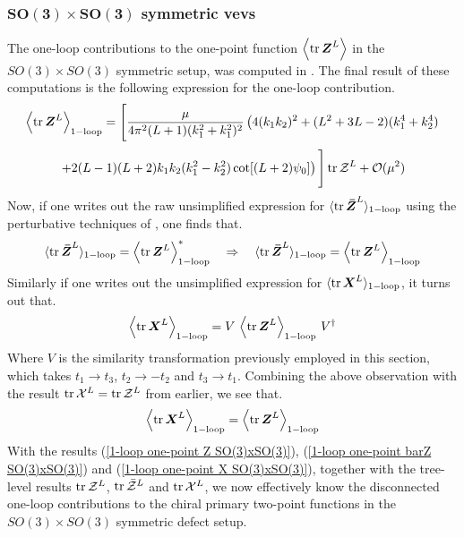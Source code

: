 \subsubsection[$SO(3) \times SO(3)$ symmetric vevs]{$\mathbf{SO(3) \times SO(3)}$ symmetric vevs}
The one-loop contributions to the one-point function $\expval{\tr \boldsymbol{Z}^{L}}$ in the $SO(3) \times SO(3)$ symmetric setup, was computed in \cite{One-point functions in D3-D7}. The final result of these computations is the following expression for the one-loop contribution.
%
%
\begin{equation*}
\expval{\tr \boldsymbol{Z}^{L}}_{\mathrm{1-loop}}
=
\Bigg[
\frac{\mu}{4 \pi^2 (L+1) (k_1^2 + k_1^2)^2}
\left(
4 (k_1 k_2)^2 + (L^2 + 3L - 2) (k_1^4 + k_2^4)
\right.
\end{equation*}
%
%
\begin{equation}\label{1-loop one-point Z SO(3)xSO(3)}
\left.
+ 2(L-1)(L+2) k_1 k_2 (k_1^2 - k_2^2) \cot[(L+2) \psi_0]
\right)
\Bigg]
\tr \mathcal{Z}^{L}
+
\mathcal{O}(\mu^2)
\end{equation}
%
%
Now, if one writes out the raw unsimplified expression for $\langle \tr \boldsymbol{\bar{Z}}^{L} \rangle_{\mathrm{1-loop}}$ using the perturbative techniques of \cite{One-point functions in D3-D7}, one finds that.
%
%
\begin{equation}\label{1-loop one-point barZ SO(3)xSO(3)}
\langle \tr \boldsymbol{\bar{Z}}^{L} \rangle_{\mathrm{1-loop}}
=
\expval{\tr \boldsymbol{Z}^{L}}_{\mathrm{1-loop}}^{*}
%
\quad \Rightarrow \quad
%
\langle \tr \boldsymbol{\bar{Z}}^{L} \rangle_{\mathrm{1-loop}}
=
\expval{\tr \boldsymbol{Z}^{L}}_{\mathrm{1-loop}}
\end{equation}
%
%
Similarly if one writes out the unsimplified expression for $\langle \tr \boldsymbol{X}^{L} \rangle_{\mathrm{1-loop}}$, it turns out that.
%
%
\begin{equation}
\expval{\tr \boldsymbol{X}^{L}}_{\mathrm{1-loop}}
=
V \, \expval{\tr \boldsymbol{Z}^{L}}_{\mathrm{1-loop}} \, V^\dagger
\end{equation}
%
%
Where $V$ is the similarity transformation previously employed in this section, which takes $t_1 \to t_3$, $t_2 \to -t_2$ and $t_3 \to t_1$. Combining the above observation with the result $\tr \mathcal{X}^{L} = \tr \mathcal{Z}^{L}$ from earlier, we see that. 
%
%
\begin{equation}\label{1-loop one-point X SO(3)xSO(3)}
\expval{\tr \boldsymbol{X}^{L}}_{\mathrm{1-loop}}
=
\expval{\tr \boldsymbol{Z}^{L}}_{\mathrm{1-loop}}
\end{equation}
%
%
With the results (\ref{1-loop one-point Z SO(3)xSO(3)}), (\ref{1-loop one-point barZ SO(3)xSO(3)}) and (\ref{1-loop one-point X SO(3)xSO(3)}), together with the tree-level results $\tr \mathcal{Z}^L$, $\tr \mathcal{\bar{Z}}^L$ and $\tr \mathcal{X}^L$, we now effectively know the disconnected one-loop contributions to the chiral primary two-point functions in the $SO(3) \times SO(3)$ symmetric defect setup.

